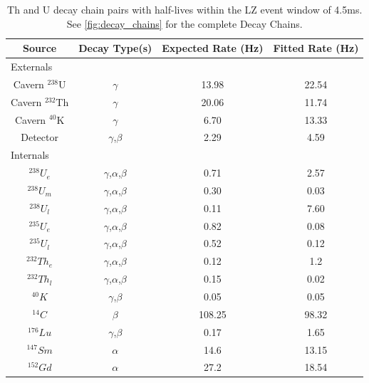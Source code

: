 \begin{table}[!htbp]
    \centering
    \begin{tabular}{c|c|c|c}
        Source               &  Decay Type(s)             & Expected Rate (Hz)       & Fitted Rate (Hz) \\ \hline
        \multicolumn{4}{l}{Externals} \\
        Cavern ${}^{238}$U   & $\gamma$                   & 13.98                      & 22.54                    \\ 
        Cavern ${}^{232}$Th  & $\gamma$                   & 20.06                      & 11.74                    \\ 
        Cavern ${}^{40}$K    & $\gamma$                   & 6.70                       & 13.33                    \\ 
        Detector             & $\gamma$,$\beta$           & 2.29                       & 4.59                    \\
        \multicolumn{4}{l}{Internals} \\
        ${}^{238}U_{e}$     & $\gamma$,$\alpha$,$\beta$  & 0.71                      & 2.57                    \\ 
        ${}^{238}U_{m}$     & $\gamma$,$\alpha$,$\beta$  & 0.30                      & 0.03                    \\
        ${}^{238}U_{l}$     & $\gamma$,$\alpha$,$\beta$  & 0.11                      & 7.60                 \\
        ${}^{235}U_{e}$     & $\gamma$,$\alpha$,$\beta$  & 0.82                      & 0.08                    \\
        ${}^{235}U_{l}$     & $\gamma$,$\alpha$,$\beta$  & 0.52                      & 0.12                    \\
        ${}^{232}Th_{e}$    & $\gamma$,$\alpha$,$\beta$  & 0.12                      & 1.2                    \\
        ${}^{232}Th_{l}$    & $\gamma$,$\alpha$,$\beta$  & 0.15                      & 0.02                    \\
        ${}^{40}K$          & $\gamma$,$\beta$           & 0.05                      & 0.05                    \\
        ${}^{14}C$          & $\beta$                    & 108.25                    & 98.32                     \\
        ${}^{176}Lu$        & $\gamma$,$\beta$           & 0.17                      & 1.65                    \\
        ${}^{147}Sm$        & $\alpha$                   & 14.6                      & 13.15                    \\
        ${}^{152}Gd$        & $\alpha$                   & 27.2                      & 18.54                     
        
    \end{tabular}
    \caption{Th and U decay chain pairs with half-lives within the LZ event window of 4.5ms. See \autoref{fig:decay_chains} for the complete Decay Chains.}
    \label{tab:od_constrainable_decays_in_data}
\end{table}